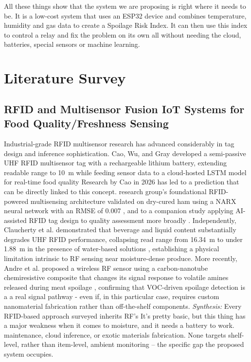 \documentclass[conference]{IEEEtran}
\begin{document}
All these things show that the system we are proposing is right where it needs to be. It is a low-cost system that uses an ESP32 device and combines temperature, humidity and gas data to create a Spoilage Risk Index. It can then use this index to control a relay and fix the problem on its own all without needing the cloud, batteries, special sensors or machine learning.

\section{Literature Survey}

\subsection{RFID and Multisensor Fusion IoT Systems for Food Quality/Freshness Sensing}

Industrial-grade RFID multisensor research has advanced considerably
in tag design and inference sophistication. Cao, Wu, and Gray
developed a semi-passive UHF RFID multisensor tag with a rechargeable
lithium battery, extending readable range to 10~m while feeding sensor
data to a cloud-hosted LSTM model for real-time food quality
Research by Cao in 2026 has led to a prediction that can be directly linked to this concept.
research group's foundational RFID-powered multisensing architecture
validated on dry-cured ham using a NARX neural network with an RMSE of
0.007 \cite{song2024rfid}, and to a companion study applying
AI-assisted RFID tag design to quality assessment more broadly
\cite{song2024sensors}. Independently, Claucherty et al. demonstrated
that beverage and liquid content substantially degrades UHF RFID
performance, collapsing read range from 16.34~m to under 1.88~m in the
presence of water-based solutions \cite{claucherty2024}, establishing
a physical limitation intrinsic to RF sensing near moisture-dense
produce. More recently, Andre et al. proposed a wireless RF sensor
using a carbon-nanotube chemiresistive composite that changes its
signal response to volatile amines released during meat spoilage
\cite{andre2024}, confirming that VOC-driven spoilage detection is a
a real signal pathway - even if, in this particular case,
requires custom nanomaterial fabrication rather than off-the-shelf
components.
\textit{Synthesis:} Every RFID-based approach surveyed inherits RF's
It's pretty basic, but this thing has a major weakness when it comes to moisture, and it needs a battery to work.
maintenance, cloud inference, or exotic materials fabrication. None
targets shelf-level, rather than item-level, ambient monitoring -- the
specific gap the proposed system occupies.
\end{document}

